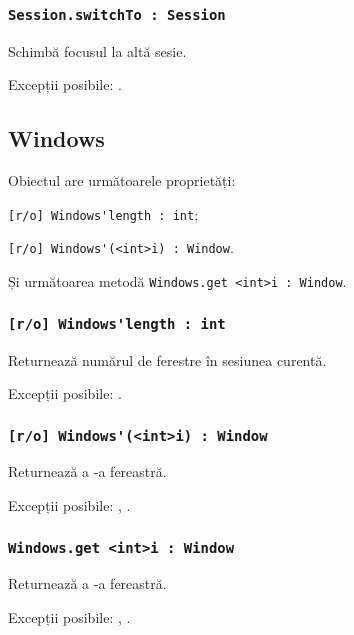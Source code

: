 \subsubsection{\lstinline|Session.switchTo : Session|}

Schimbă focusul la altă sesie.

Excepții posibile: .


\subsection{{\color{orange} Windows}}

Obiectul \windows{} are următoarele proprietăți:
\begin{icItems}
	\item \lstinline|[r/o] Windows'length : int|;
	\item \lstinline|[r/o] Windows'(<int>i) : Window|.
\end{icItems}

Și următoarea metodă \lstinline|Windows.get <int>i : Window|.

\subsubsection{\lstinline|[r/o] Windows'length : int|}

Returnează numărul de ferestre în sesiunea curentă.

Excepții posibile: .

\subsubsection{\lstinline|[r/o] Windows'(<int>i) : Window|}

Returnează a -a fereastră.

Excepții posibile: , .

\subsubsection{\lstinline|Windows.get <int>i : Window|}

Returnează a -a fereastră.

Excepții posibile: , .

